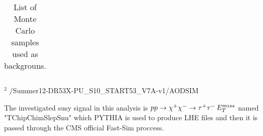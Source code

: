 \begin{table}[!ht]
\begin{center}
{\begin{tabular}{|l|l|c|}
\hline

\end{tabular}
}
\end{center}
$^{2}$ /Summer12-DR53X-PU\_S10\_START53\_V7A-v1/AODSIM\\

\caption{ 
  List of Monte Carlo samples used as backgrouns.
}
\label{Tab.MCSamples}

\end{table}

The investigated susy signal in this analysis is $pp \rightarrow \chi^+ \chi^- \rightarrow \tau^+ \tau^- \,{E_T^{miss}}$ named "TChipChimSlepSnu" which PYTHIA is used to produce LHE files and then it is passed through the CMS official Fast-Sim proccess.
